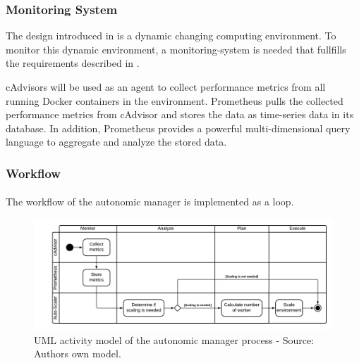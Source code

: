 \subsubsection{Monitoring System}
The design introduced in  is a dynamic changing computing environment. To monitor this dynamic environment, a monitoring-system is needed that fullfills the requirements described in .


cAdvisors will be used as an agent to collect performance metrics from all running Docker containers in the environment.
Prometheus pulls the collected performance metrics from cAdvisor and stores the data as time-series data in its database.
In addition, Prometheus provides a powerful multi-dimensional query language to aggregate and analyze the stored data.



\subsubsection{Workflow}

\paragraph{} The workflow of the autonomic manager is implemented as a loop.

\begin{figure}[h]
\centering
\includegraphics[scale=0.50]{images/05_conceptual_design/autonomic_manager/autonomic_manager_workflow}
\caption{UML activity model of the autonomic manager process - Source: Authors own model.}
\label{fig:am-workflow}
\end{figure}
